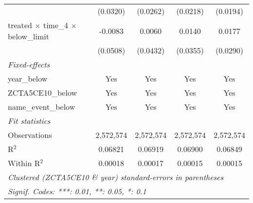 \begin{tabular}{lcccc}
                                                       & (0.0320)        & (0.0262)        & (0.0218)        & (0.0194)\\   
   treated $\times$ time\_4 $\times$ below\_limit      & -0.0083         & 0.0060          & 0.0140          & 0.0177\\   
                                                       & (0.0508)        & (0.0432)        & (0.0355)        & (0.0290)\\   
   \midrule
   \emph{Fixed-effects}\\
   year\_below                                         & Yes             & Yes             & Yes             & Yes\\  
   ZCTA5CE10\_below                                    & Yes             & Yes             & Yes             & Yes\\  
   name\_event\_below                                  & Yes             & Yes             & Yes             & Yes\\  
   \midrule
   \emph{Fit statistics}\\
   Observations                                        & 2,572,574       & 2,572,574       & 2,572,574       & 2,572,574\\  
   R$^2$                                               & 0.06821         & 0.06919         & 0.06900         & 0.06849\\  
   Within R$^2$                                        & 0.00018         & 0.00017         & 0.00015         & 0.00015\\  
   \midrule \midrule
   \multicolumn{5}{l}{\emph{Clustered (ZCTA5CE10 \& year) standard-errors in parentheses}}\\
   \multicolumn{5}{l}{\emph{Signif. Codes: ***: 0.01, **: 0.05, *: 0.1}}\\
\end{tabular}
\par\endgroup
